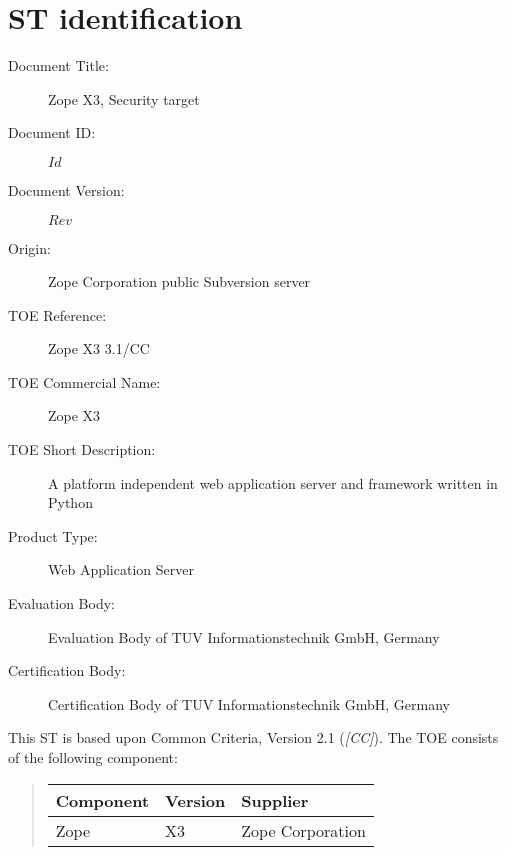 \documentclass[12pt,english]{scrbook}
\begin{document}
\section{ST identification}

\begin{description}
\item [Document Title:]
Zope X3, Security target


\item [Document ID:]
$Id$


\item [Document Version:]
$Rev$


\item [Origin:]
Zope Corporation public Subversion server


\item [TOE Reference:]
Zope X3 3.1/CC              %


\item [TOE Commercial Name:]
Zope X3                     %


\item [TOE Short Description:]
A platform independent web application server and framework written in Python


\item [Product Type:]
Web Application Server


\item [Evaluation Body:]
Evaluation Body of TUV Informationstechnik GmbH, Germany


\item [Certification Body:]
Certification Body of TUV Informationstechnik GmbH, Germany


\end{description}

This ST is based upon Common Criteria, Version 2.1 (\emph{{[}CC]}).
The TOE consists of the following component:
\begin{quote}

\begin{longtable}[c]{|l|l|l|}
\hline
\textbf{
Component
} & \textbf{
Version
} & \textbf{
Supplier
} \\
\hline
\endhead

Zope
 & 
X3
 & 
Zope Corporation
 \\
\hline
\end{longtable}
\end{quote}


\end{document}
